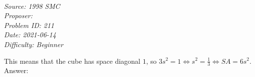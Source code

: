 \SSbreak\\
\emph{Source: 1998 SMC}\\
\emph{Proposer: \Pss}\\ %
\emph{Problem ID: 211}\\
\emph{Date: 2021-06-14}\\
\emph{Difficulty: Beginner}\\
\SSbreak

\bigskip

\begin{solution}\hfil\medskip
  
    This means that the cube has space diagonal $1$, so $3s^2 = 1 \iff s^2 = \frac{1}{3} \iff SA = 6s^2.$ Answer: 
\end{solution}\bigskip
